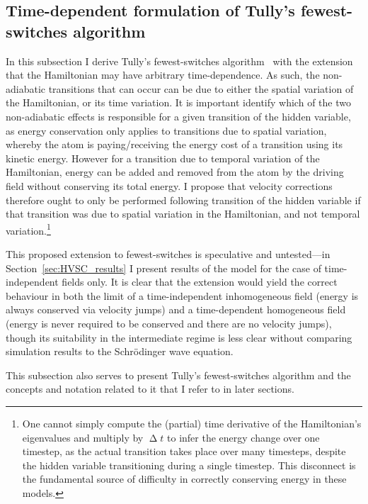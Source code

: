 \subsection{Time-dependent formulation of Tully's fewest-switches algorithm}\label{sec:fewest_switches}

In this subsection I derive Tully's fewest-switches algorithm~\cite{doi:10.1146/annurev-physchem-040215-112245, doi:10.1063/1.459170} with the extension that the Hamiltonian may have arbitrary time-dependence. As such, the non-adiabatic transitions that can occur can be due to either the spatial variation of the Hamiltonian, or its time variation. It is important identify which of the two non-adiabatic effects is responsible for a given transition of the hidden variable, as energy conservation only applies to transitions due to spatial variation, whereby the atom is paying/receiving the energy cost of a transition using its kinetic energy. However for a transition due to temporal variation of the Hamiltonian, energy can be added and removed from the atom by the driving field without conserving its total energy. I propose that velocity corrections therefore ought to only be performed following transition of the hidden variable if that transition was due to spatial variation in the Hamiltonian, and not temporal variation.\footnote{One cannot simply compute the (partial) time derivative of the Hamiltonian's eigenvalues and multiply by $\upDelta t$ to infer the energy change over one timestep, as the actual transition takes place over many timesteps, despite the hidden variable transitioning during a single timestep. This disconnect is the fundamental source of difficulty in correctly conserving energy in these models.}

This proposed extension to fewest-switches is speculative and untested---in Section~\ref{sec:HVSC_results} I present results of the model for the case of time-independent fields only. It is clear that the extension would yield the correct behaviour in both the limit of a time-independent inhomogeneous field (energy is always conserved via velocity jumps) and a time-dependent homogeneous field (energy is never required to be conserved and there are no velocity jumps), though its suitability in the intermediate regime is less clear without comparing simulation results to the Schr\"odinger wave equation.

This subsection also serves to present Tully's fewest-switches algorithm and the concepts and notation related to it that I refer to in later sections.

